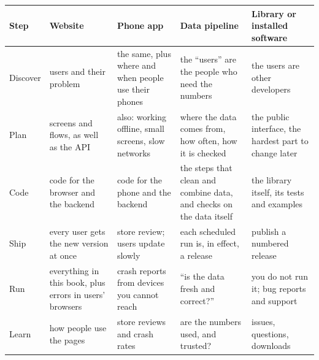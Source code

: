
{\def\LTcaptype{none} %
\begin{longtable}[]{@{}
  >{\raggedright\arraybackslash}p{}
  >{\raggedright\arraybackslash}p{}
  >{\raggedright\arraybackslash}p{}
  >{\raggedright\arraybackslash}p{}
  >{\raggedright\arraybackslash}p{}@{}}
\toprule\noalign{}
\begin{minipage}[b]{\linewidth}\raggedright
Step
\end{minipage} & \begin{minipage}[b]{\linewidth}\raggedright
Website
\end{minipage} & \begin{minipage}[b]{\linewidth}\raggedright
Phone app
\end{minipage} & \begin{minipage}[b]{\linewidth}\raggedright
Data pipeline
\end{minipage} & \begin{minipage}[b]{\linewidth}\raggedright
Library or installed software
\end{minipage} \\
\midrule\noalign{}
\endhead
\bottomrule\noalign{}
\endlastfoot
Discover & users and their problem & the same, plus where and when people use their phones & the ``users'' are the people who need the numbers & the users are other developers \\
Plan & screens and flows, as well as the API & also: working offline, small screens, slow networks & where the data comes from, how often, how it is checked & the public interface, the hardest part to change later \\
Code & code for the browser and the backend & code for the phone and the backend & the steps that clean and combine data, and checks on the data itself & the library itself, its tests and examples \\
Ship & every user gets the new version at once & store review; users update slowly & each scheduled run is, in effect, a release & publish a numbered release \\
Run & everything in this book, plus errors in users' browsers & crash reports from devices you cannot reach & ``is the data fresh and correct?'' & you do not run it; bug reports and support \\
Learn & how people use the pages & store reviews and crash rates & are the numbers used, and trusted? & issues, questions, downloads \\
\end{longtable}
}

